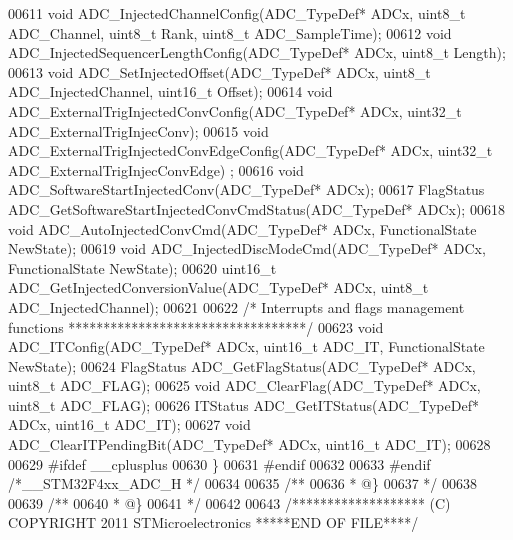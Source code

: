 \begin{DoxyCode}
00611 \textcolor{keywordtype}{void} ADC_InjectedChannelConfig(ADC\_TypeDef* ADCx, uint8\_t ADC\_Channel, uint8\_t Rank, uint8\_t 
      ADC\_SampleTime);
00612 \textcolor{keywordtype}{void} ADC_InjectedSequencerLengthConfig(ADC\_TypeDef* ADCx, uint8\_t Length);
00613 \textcolor{keywordtype}{void} ADC_SetInjectedOffset(ADC\_TypeDef* ADCx, uint8\_t ADC\_InjectedChannel, uint16\_t Offset);
00614 \textcolor{keywordtype}{void} ADC_ExternalTrigInjectedConvConfig(ADC\_TypeDef* ADCx, uint32\_t ADC\_ExternalTrigInjecConv);
00615 \textcolor{keywordtype}{void} ADC_ExternalTrigInjectedConvEdgeConfig(ADC\_TypeDef* ADCx, uint32\_t ADC\_ExternalTrigInjecConvEdge)
      ;
00616 \textcolor{keywordtype}{void} ADC_SoftwareStartInjectedConv(ADC\_TypeDef* ADCx);
00617 FlagStatus ADC_GetSoftwareStartInjectedConvCmdStatus(ADC\_TypeDef* ADCx);
00618 \textcolor{keywordtype}{void} ADC_AutoInjectedConvCmd(ADC\_TypeDef* ADCx, FunctionalState NewState);
00619 \textcolor{keywordtype}{void} ADC_InjectedDiscModeCmd(ADC\_TypeDef* ADCx, FunctionalState NewState);
00620 uint16\_t ADC_GetInjectedConversionValue(ADC\_TypeDef* ADCx, uint8\_t ADC\_InjectedChannel);
00621 
00622 \textcolor{comment}{/* Interrupts and flags management functions **********************************/}
00623 \textcolor{keywordtype}{void} ADC_ITConfig(ADC\_TypeDef* ADCx, uint16\_t ADC\_IT, FunctionalState NewState);
00624 FlagStatus ADC_GetFlagStatus(ADC\_TypeDef* ADCx, uint8\_t ADC\_FLAG);
00625 \textcolor{keywordtype}{void} ADC_ClearFlag(ADC\_TypeDef* ADCx, uint8\_t ADC\_FLAG);
00626 ITStatus ADC_GetITStatus(ADC\_TypeDef* ADCx, uint16\_t ADC\_IT);
00627 \textcolor{keywordtype}{void} ADC_ClearITPendingBit(ADC\_TypeDef* ADCx, uint16\_t ADC\_IT);
00628 
00629 \textcolor{preprocessor}{#}\textcolor{preprocessor}{ifdef} \_\_cplusplus
00630 \}
00631 \textcolor{preprocessor}{#}\textcolor{preprocessor}{endif}
00632 
00633 \textcolor{preprocessor}{#}\textcolor{preprocessor}{endif} \textcolor{comment}{/*\_\_STM32F4xx\_ADC\_H */}
00634 
00635 \textcolor{comment}{/**}
00636 \textcolor{comment}{  * @\}}
00637 \textcolor{comment}{  */}
00638 
00639 \textcolor{comment}{/**}
00640 \textcolor{comment}{  * @\}}
00641 \textcolor{comment}{  */}
00642 
00643 \textcolor{comment}{/******************* (C) COPYRIGHT 2011 STMicroelectronics *****END OF FILE****/}
\end{DoxyCode}
